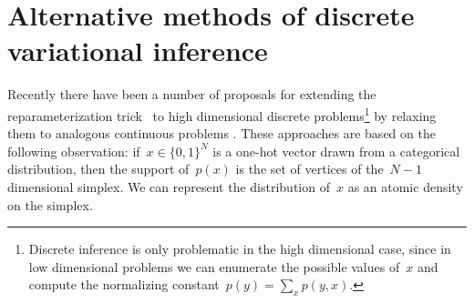 \documentclass[twoside]{article}
\begin{document}
%

%

\appendix



\section{Alternative methods of discrete variational inference}

Recently there have been a number of proposals for extending the
reparameterization trick~\citep{rezende2014stochastic, Kingma2014} to
high dimensional discrete problems\footnote{Discrete inference is only
  problematic in the high dimensional case, since in low dimensional
  problems we can enumerate the possible values of~$x$ and compute the
  normalizing constant~$p(y) = \sum_x p(y, x)$.} by relaxing them to
analogous continuous problems \citep{maddison2016concrete,
  jang2016categorical, kusner2016gans}.  These approaches are based on
the following observation: if~$x \in \{0,1\}^N$ is a one-hot vector
drawn from a categorical distribution, then the support of~$p(x)$ is
the set of vertices of the~$N-1$ dimensional simplex.  We can
represent the distribution of~$x$ as an atomic density on the simplex.
\end{document}
